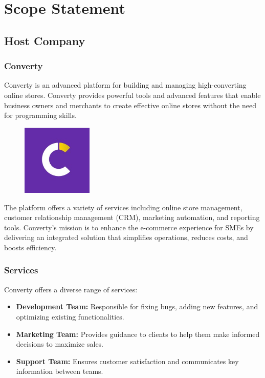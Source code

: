 \chapter{Scope Statement}

\section{Host Company}
\subsection{Converty}
Converty is an advanced platform for building and managing high-converting online stores. Converty provides powerful tools and advanced features that enable business owners and merchants to create effective online stores without the need for programming skills.

\begin{figure}[h]
  \centering
  \includegraphics[width=0.3\textwidth]{Images/convertyLogo.jpeg}
  \label{fig:Converty Logo}
\end{figure}

The platform offers a variety of services including online store management, customer relationship management (CRM), marketing automation, and reporting tools. Converty's mission is to enhance the e-commerce experience for SMEs by delivering an integrated solution that simplifies operations, reduces costs, and boosts efficiency.
\newline

\subsection{Services}
Converty offers a diverse range of services:
\begin{itemize}
    \item \textbf{Development Team:} Responsible for fixing bugs, adding new features, and optimizing existing functionalities.
    \item \textbf{Marketing Team:} Provides guidance to clients to help them make informed decisions to maximize sales.
    \item \textbf{Support Team:} Ensures customer satisfaction and communicates key information between teams.
\end{itemize}

